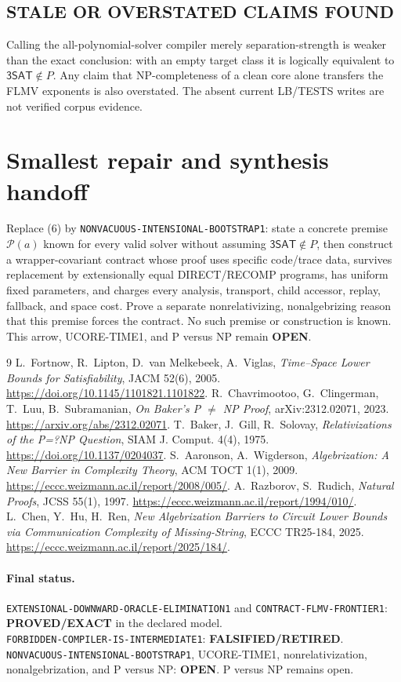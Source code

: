 \documentclass[11pt]{article}
\newcommand{\SAT}{\mathsf{3SAT}}
\newcommand{\EXACT}{\textbf{PROVED/EXACT}}
\newcommand{\OPEN}{\textbf{OPEN}}
\newcommand{\RETIRED}{\textbf{FALSIFIED/RETIRED}}
\begin{document}
\subsection*{STALE OR OVERSTATED CLAIMS FOUND}
Calling the all-polynomial-solver compiler merely separation-strength is
weaker than the exact conclusion: with an empty target class it is logically
equivalent to $\SAT\notin P$.  Any claim that NP-completeness of a clean core
alone transfers the FLMV exponents is also overstated.  The absent current
LB/TESTS writes are not verified corpus evidence.

\section{Smallest repair and synthesis handoff}

Replace (6) by \texttt{NONVACUOUS-INTENSIONAL-BOOTSTRAP1}: state a concrete
premise $\mathcal P(a)$ known for every valid solver without assuming
$\SAT\notin P$, then construct a wrapper-covariant contract whose proof uses
specific code/trace data, survives replacement by extensionally equal
DIRECT/RECOMP programs, has uniform fixed parameters, and charges every
analysis, transport, child accessor, replay, fallback, and space cost.
Prove a separate nonrelativizing, nonalgebrizing reason that this premise
forces the contract.  No such premise or construction is known.  This arrow,
UCORE-TIME1, and P versus NP remain \OPEN.

\begin{thebibliography}{9}
 L.~Fortnow, R.~Lipton, D.~van Melkebeek, A.~Viglas,
\emph{Time--Space Lower Bounds for Satisfiability}, JACM 52(6), 2005.
\url{https://doi.org/10.1145/1101821.1101822}.
 R.~Chavrimootoo, G.~Clingerman, T.~Luu, B.~Subramanian,
\emph{On Baker's P $\ne$ NP Proof}, arXiv:2312.02071, 2023.
\url{https://arxiv.org/abs/2312.02071}.
 T.~Baker, J.~Gill, R.~Solovay,
\emph{Relativizations of the P=?NP Question}, SIAM J. Comput. 4(4), 1975.
\url{https://doi.org/10.1137/0204037}.
 S.~Aaronson, A.~Wigderson,
\emph{Algebrization: A New Barrier in Complexity Theory}, ACM TOCT 1(1), 2009.
\url{https://eccc.weizmann.ac.il/report/2008/005/}.
 A.~Razborov, S.~Rudich, \emph{Natural Proofs}, JCSS 55(1), 1997.
\url{https://eccc.weizmann.ac.il/report/1994/010/}.
 L.~Chen, Y.~Hu, H.~Ren,
\emph{New Algebrization Barriers to Circuit Lower Bounds via Communication
Complexity of Missing-String}, ECCC TR25-184, 2025.
\url{https://eccc.weizmann.ac.il/report/2025/184/}.
\end{thebibliography}

\paragraph{Final status.}
\texttt{EXTENSIONAL-DOWNWARD-ORACLE-ELIMINATION1} and
\texttt{CONTRACT-FLMV-FRONTIER1}: \EXACT{} in the declared model.\\
\texttt{FORBIDDEN-COMPILER-IS-INTERMEDIATE1}: \RETIRED.\\
\texttt{NONVACUOUS-INTENSIONAL-BOOTSTRAP1}, UCORE-TIME1,
nonrelativization, nonalgebrization, and P versus NP: \OPEN.
P versus NP remains open.

\end{document}
